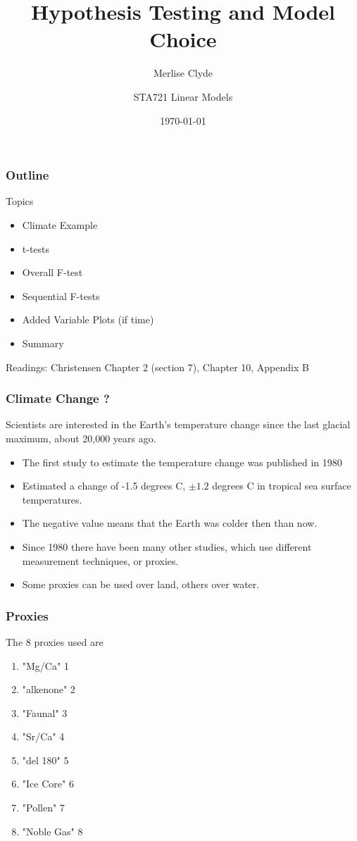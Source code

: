 \documentclass[handout]{beamer}
\title{Hypothesis Testing and Model Choice}
\subtitle{Merlise Clyde}
\author{STA721 Linear Models}
\institute{Duke University}
\date{\today}
\begin{document}
\maketitle

\begin{frame}\frametitle{Outline}
Topics
  \begin{itemize}
  \item Climate Example
  \item t-tests
  \item Overall F-test
  \item Sequential F-tests
  \item Added Variable Plots (if time)
  \item Summary

  \end{itemize}


Readings: Christensen Chapter 2 (section 7),  Chapter 10, Appendix B
\end{frame}

\begin{frame}
  \frametitle{Climate Change ?}
  Scientists are interested in the Earth's temperature change since the last
glacial maximum, about 20,000 years ago. \pause
\begin{itemize}
\item  The first study to estimate the
temperature change was published in 1980
\item  Estimated a change of -1.5
degrees C, $\pm 1.2$ degrees C in tropical sea surface temperatures.
\item The
negative value means that the Earth was colder then than now.
\item Since 1980
there have been many other studies, which use different
measurement techniques, or proxies.
\item Some proxies can be used over land,
others over water.
\end{itemize}
\end{frame}

\begin{frame}
  \frametitle{Proxies}
   The 8 proxies used are

   \begin{enumerate}
   \item    "Mg/Ca"           1
   \item    "alkenone"        2
   \item    "Faunal"          3
   \item    "Sr/Ca"           4
   \item    "del 180"         5
   \item    "Ice Core"        6
   \item    "Pollen"          7
   \item    "Noble Gas"       8
   \end{enumerate}

\end{frame}
\end{document}
